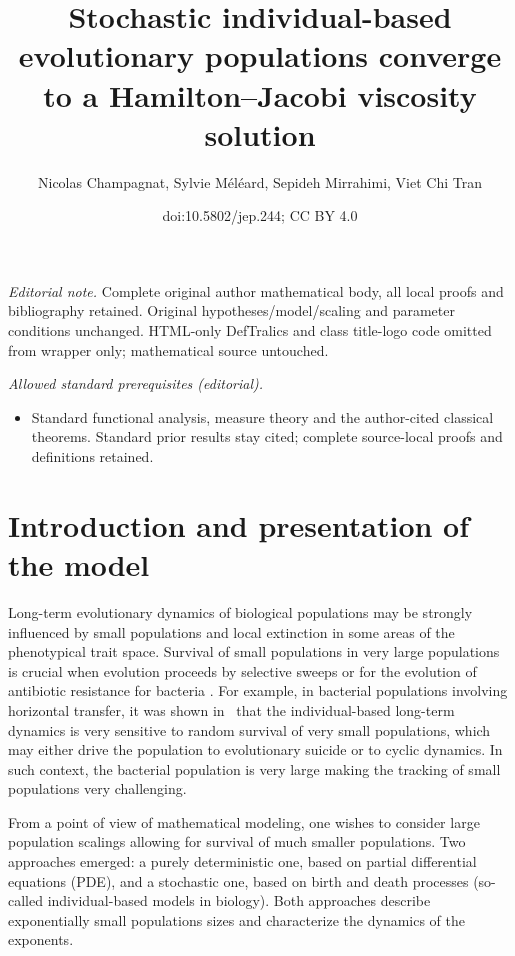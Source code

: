 \documentclass[10pt]{amsart}
\title{Stochastic individual-based evolutionary populations converge to a Hamilton–Jacobi viscosity solution}
\author{Nicolas Champagnat, Sylvie Méléard, Sepideh Mirrahimi, Viet Chi Tran}
\date{doi:10.5802/jep.244; CC BY 4.0}
\theoremstyle{plain}
\theoremstyle{remark}
\begin{document}
\maketitle
\noindent\textit{Editorial note.} Complete original author mathematical body, all local proofs and bibliography retained. Original hypotheses/model/scaling and parameter conditions unchanged. HTML-only DefTralics and class title-logo code omitted from wrapper only; mathematical source untouched.\par\medskip
\noindent\textit{Allowed standard prerequisites (editorial).}\begin{itemize}
\item Standard functional analysis, measure theory and the author-cited classical theorems. Standard prior results stay cited; complete source-local proofs and definitions retained.
\end{itemize}\medskip
\vspace*{-\baselineskip}
\tableofcontents


\section{Introduction and presentation of the model}
\label{sec:introduction}

Long-term evolutionary dynamics of biological populations may be strongly influenced by small populations and local extinction in some areas of the phenotypical trait space. Survival of small populations in very large populations is crucial when evolution proceeds by selective sweeps \cite{keelingpalmer2008} or for the evolution of antibiotic resistance for bacteria \cite{ochmanlawrencegroisman,stewartlevin}. For example, in bacterial populations involving horizontal transfer, it was shown in~\cite{billiardcolletferrieremeleardtran,calvez20} that the individual-based long-term dynamics is very sensitive to random survival of very small populations, which may either drive the population to evolutionary suicide or to cyclic dynamics. In such context, the bacterial population is very large making the tracking of small populations very challenging.

From a point of view of mathematical modeling, one wishes to consider large population scalings allowing for survival of much smaller populations. Two approaches emerged: a purely deterministic one, based on partial differential equations (PDE), and a stochastic one, based on birth and death processes (so-called individual-based models in biology). Both approaches describe exponentially small populations sizes and characterize the dynamics of the exponents.
\end{document}
